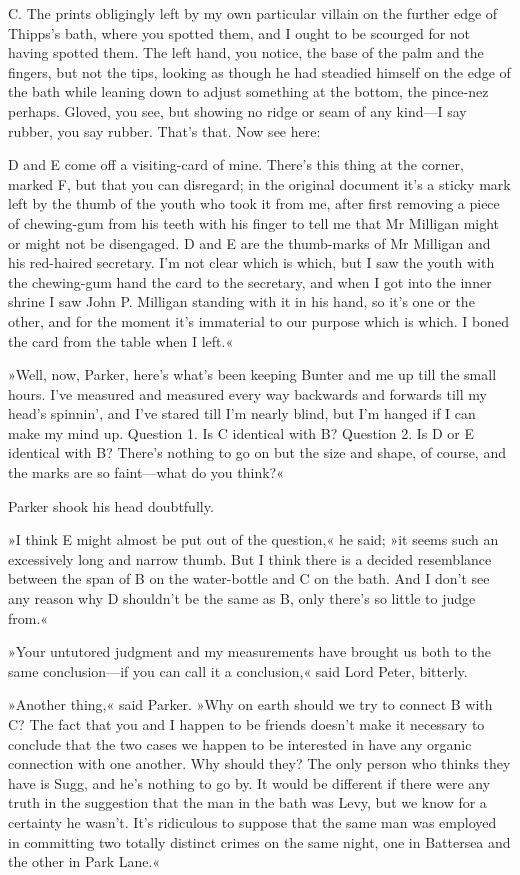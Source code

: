 \textsc{C.} The prints obligingly left by my own particular villain on the further edge of Thipps's bath, where you spotted them, and I ought to be scourged for not having spotted them. The left hand, you notice, the base of the palm and the fingers, but not the tips, looking as though he had steadied himself on the edge of the bath while leaning down to adjust something at the bottom, the pince-nez perhaps. Gloved, you see, but showing no ridge or seam of any kind—I say rubber, you say rubber. That's that. Now see here:

\textsc{D} and \textsc{E} come off a visiting-card of mine. There's this thing at the corner, marked F, but that you can disregard; in the original document it's a sticky mark left by the thumb of the youth who took it from me, after first removing a piece of chewing-gum from his teeth with his finger to tell me that Mr Milligan might or might not be disengaged. D and E are the thumb-marks of Mr Milligan and his red-haired secretary. I'm not clear which is which, but I saw the youth with the chewing-gum hand the card to the secretary, and when I got into the inner shrine I saw John P. Milligan standing with it in his hand, so it's one or the other, and for the moment it's immaterial to our purpose which is which. I boned the card from the table when I left.«

»Well, now, Parker, here's what's been keeping Bunter and me up till the small hours. I've measured and measured every way backwards and forwards till my head's spinnin', and I've stared till I'm nearly blind, but I'm hanged if I can make my mind up. Question 1. Is \textsc{C} identical with \textsc{B}? Question 2. Is \textsc{D} or \textsc{E} identical with \textsc{B}? There's nothing to go on but the size and shape, of course, and the marks are so faint—what do you think?«

Parker shook his head doubtfully.

»I think \textsc{E} might almost be put out of the question,« he said; »it seems such an excessively long and narrow thumb. But I think there is a decided resemblance between the span of \textsc{B} on the water-bottle and \textsc{C} on the bath. And I don't see any reason why \textsc{D} shouldn't be the same as \textsc{B}, only there's so little to judge from.«

»Your untutored judgment and my measurements have brought us both to the same conclusion—if you can call it a conclusion,« said Lord Peter, bitterly.

»Another thing,« said Parker. »Why on earth should we try to connect \textsc{B} with \textsc{C}? The fact that you and I happen to be friends doesn't make it necessary to conclude that the two cases we happen to be interested in have any organic connection with one another. Why should they? The only person who thinks they have is Sugg, and he's nothing to go by. It would be different if there were any truth in the suggestion that the man in the bath was Levy, but we know for a certainty he wasn't. It's ridiculous to suppose that the same man was employed in committing two totally distinct crimes on the same night, one in Battersea and the other in Park Lane.«

